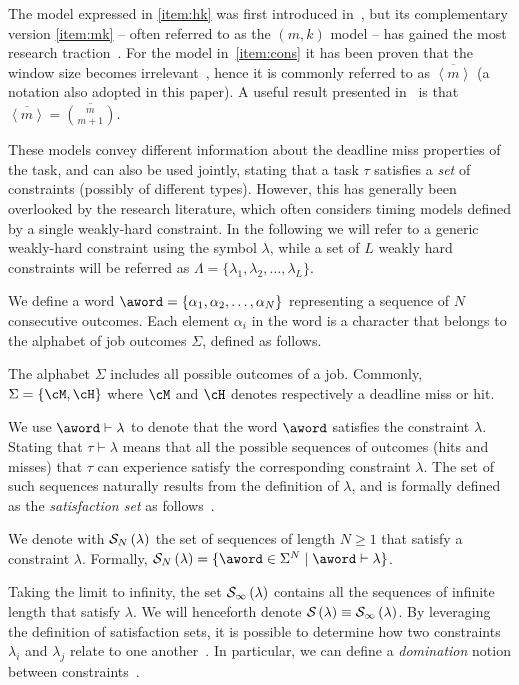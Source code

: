 The model expressed in \ref{item:hk} was first introduced in~\cite{Hamdaoui:1995}, but its complementary version \ref{item:mk} -- often referred to as the $(m,k)$ model -- has gained the most research traction~\cite{pazzaglia2020generalized, Hammadeh:2019, Natarajan:2019}.
For the model in~\ref{item:cons} it has been proven that the window size becomes irrelevant~\cite{Bernat:2001}, hence it is commonly referred to as $\overbar{\left<m\right>}$ (a notation also adopted in this paper).
A useful result presented in~\cite{Maggio:2020} is that $\overbar{\left<m\right>} = \overbar{\binom{m}{m+1}}$.

These models convey different information about the deadline miss properties of the task, and can also be used jointly, stating that a task $\tau$ satisfies a \emph{set} of constraints (possibly of different types).
However, this has generally been overlooked by the research literature, which often considers timing models defined by a single weakly-hard constraint.
%
In the following we will refer to a generic weakly-hard constraint using the symbol $\lambda$, while a set of $L$ weakly hard constraints will be referred as $\Lambda = \{ \lambda_1, \lambda_2, \dots, \lambda_L \}$.

We define a word $\aword= \{\alpha_1, \alpha_2, \dots, \alpha_N\}$ representing a sequence of $N$ consecutive outcomes.
Each element $\alpha_i$ in the word is a character that belongs to the alphabet of job outcomes $\Sigma$, defined as follows.

\begin{definition}%
    \label{def:basic-alphabet}%
    The alphabet $\Sigma$ includes all possible outcomes of a job.
    Commonly, $\Sigma = \{ \cM, \cH \}$ where $\cM$ and $\cH$ denotes respectively a deadline miss or hit.
\end{definition}

We use $\aword \vdash \lambda$ to denote that the word $\aword$ satisfies the constraint $\lambda$. 
Stating that $\tau \vdash \lambda$ means that all the possible sequences of outcomes (hits and misses) that $\tau$ can experience satisfy the corresponding constraint $\lambda$.
The set of such sequences naturally results from the definition of $\lambda$, and is formally defined as the \emph{satisfaction set} as follows~\cite{Bernat:2001}.

\begin{definition}%
    \label{def:satisfaction}%
    We denote with $\mathcal{S}_{N}\left( \lambda \right)$ the set of sequences of length $N \geq 1$ that satisfy a constraint $\lambda$.
    Formally, $\sset{N}{\lambda} = \{ \aword \in \Sigma^N \mid \aword \vdash \lambda \}$.
\end{definition}
Taking the limit to infinity, the set $\mathcal{S}_{\infty}\left( \lambda \right)$ contains all the sequences of infinite length that satisfy $\lambda$.
We will henceforth denote $\mathcal{S}_{}\left( \lambda \right) \equiv \mathcal{S}_{\infty}\left( \lambda \right)$.
%
By leveraging the definition of satisfaction sets, it is possible to determine how two constraints $\lambda_i$ and $\lambda_j$ relate to one another~\cite{Bernat:2001, Wu:2020}.
In particular, we can define a \emph{domination} notion between constraints~\cite{Bernat:2001}.

